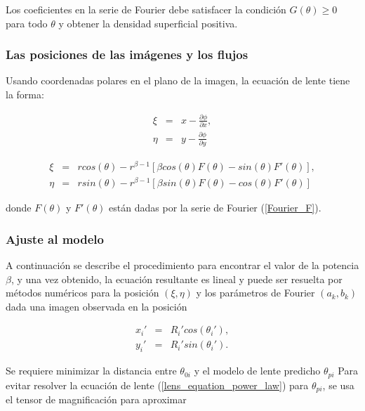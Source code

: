 Los coeficientes en la serie de Fourier debe satisfacer la condición $G(\theta) \geq 0$ para todo $\theta$ y obtener la densidad superficial positiva. 

\subsubsection{Las posiciones de las imágenes y los flujos}

Usando coordenadas polares en el plano de la imagen, la ecuación de lente tiene la forma:

\begin{eqnarray}
\xi & = & x - \frac{\partial \phi}{\partial x}, \\
\eta & = &  y - \frac{\partial \phi}{\partial y}
\end{eqnarray}



\begin{eqnarray}
\label{lens_equation_power_law}
\xi & = & r cos(\theta) - r^{\beta-1}\left[ \beta cos(\theta)F(\theta) - sin(\theta) F'(\theta)  \right] , \\
\eta & = &  r sin(\theta) - r^{\beta-1}\left[ \beta sin(\theta)F(\theta) - cos(\theta) F'(\theta)  \right]
\end{eqnarray}

donde $F(\theta)$ y $F'(\theta)$ están dadas por la serie de Fourier (\ref{Fourier_F}).\\

\subsubsection{Ajuste al modelo}

A continuación se describe el procedimiento para encontrar el valor de la potencia $\beta$, y una vez obtenido, la ecuación resultante es lineal y puede ser resuelta por métodos numéricos para la posición $(\xi, \eta)$ y los parámetros de Fourier $(a_k, b_k)$ dada una imagen observada en la posición

\begin{eqnarray}
x_i' &=& R_i' cos (\theta_i'),\\
y_i' &=& R_i' sin (\theta_i').
\end{eqnarray}
 
Se requiere minimizar la distancia entre \textbf{$\theta_{0i}$} y el modelo de lente predicho \textbf{$\theta_{pi}$} Para evitar resolver la ecuación de lente (\ref{lens_equation_power_law}) para  \textbf{$\theta_{pi}$}, se usa el tensor de magnificación para aproximar 

